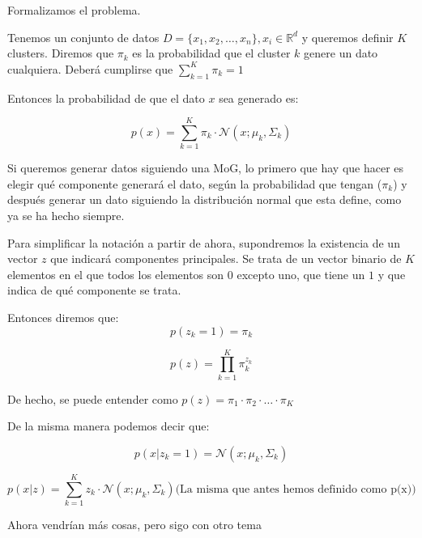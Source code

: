 Formalizamos el problema.

Tenemos un conjunto de datos $D = \{x_1, x_2, \dots, x_n\}, x_i \in \mathbb{R}^d$ y queremos definir $K$ clusters. Diremos que $\pi_k$ es la probabilidad que el cluster $k$ genere un dato cualquiera. Deberá cumplirse que $\sum_{k = 1}^K \pi_k = 1$

Entonces la probabilidad de que el dato $x$ sea generado es:

\begin{equation*}
p(x) = \sum_{k = 1}^{K} \pi_k \cdot \mathcal{N}(x; \mu_k, \Sigma_k)
\end{equation*}

Si queremos generar datos siguiendo una MoG, lo primero que hay que hacer es elegir qué componente generará el dato, según la probabilidad que tengan ($\pi_k$) y después generar un dato siguiendo la distribución normal que esta define, como ya se ha hecho siempre.

Para simplificar la notación a partir de ahora, supondremos la existencia de un vector $z$ que indicará componentes principales. Se trata de un vector binario de $K$ elementos en el que todos los elementos son $0$ excepto uno, que tiene un $1$ y que indica de qué componente se trata.

Entonces diremos que:
\begin{equation*}
p(z_k = 1) = \pi_k
\end{equation*}

\begin{equation*}
p(z) = \prod_{k = 1}^{K} \pi_k^{z_k}
\end{equation*}

De hecho, se puede entender como $p(z) = \pi_1 \cdot \pi_2 \cdot \dots \cdot \pi_K$

De la misma manera podemos decir que:

\begin{equation*}
p(x | z_k = 1) = \mathcal{N}(x; \mu_k, \Sigma_k)
\end{equation*}

\begin{equation*}
p(x | z) = \sum_{k = 1}^{K} z_k \cdot \mathcal{N}(x; \mu_k, \Sigma_k) \text{(La misma que antes hemos definido como p(x))}
\end{equation*}




Ahora vendrían más cosas, pero sigo con otro tema

